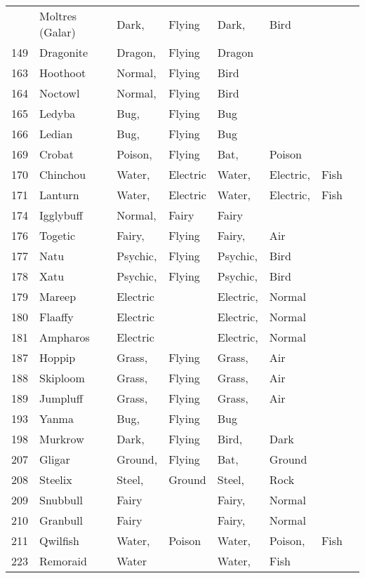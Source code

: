 \documentclass{article}
\begin{document}
\begin{longtable}{rl|ll|llll}
    & Moltres (Galar) & Dark, & Flying & Dark, & Bird &  &  \\
149 & Dragonite & Dragon, & Flying & Dragon &  &  &  \\
\hline %
163 & Hoothoot & Normal, & Flying & Bird &  &  &  \\
164 & Noctowl & Normal, & Flying & Bird &  &  &  \\
165 & Ledyba & Bug, & Flying & Bug &  &  &  \\
166 & Ledian & Bug, & Flying & Bug &  &  &  \\
169 & Crobat & Poison, & Flying & Bat, & Poison &  \\
170 & Chinchou & Water, & Electric & Water, & Electric, & Fish &  \\
171 & Lanturn & Water, & Electric & Water, & Electric, & Fish &  \\
174 & Igglybuff & Normal, & Fairy & Fairy &  &  \\
176 & Togetic & Fairy, & Flying & Fairy, & Air &  &  \\
177 & Natu & Psychic, & Flying & Psychic, & Bird &  &  \\
178 & Xatu & Psychic, & Flying & Psychic, & Bird &  &  \\
179 & Mareep & Electric &  & Electric, & Normal &  &  \\
180 & Flaaffy & Electric &  & Electric, & Normal &  &  \\
181 & Ampharos & Electric &  & Electric, & Normal &  &  \\
187 & Hoppip & Grass, & Flying & Grass, & Air &  &  \\
188 & Skiploom & Grass, & Flying & Grass, & Air &  &  \\
189 & Jumpluff & Grass, & Flying & Grass, & Air &  &  \\
193 & Yanma & Bug, & Flying & Bug &  &  &  \\
198 & Murkrow & Dark, & Flying & Bird, & Dark &  &  \\
207 & Gligar & Ground, & Flying & Bat, & Ground &  &  \\
208 & Steelix & Steel, & Ground & Steel, & Rock &  &  \\
209 & Snubbull & Fairy &  & Fairy, & Normal &  &  \\
210 & Granbull & Fairy &  & Fairy, & Normal &  &  \\
211 & Qwilfish & Water, & Poison & Water, & Poison, & Fish &  \\
223 & Remoraid & Water &  & Water, & Fish &  &  \\

\end{longtable}
\end{document}
